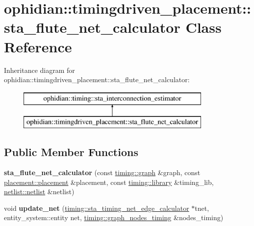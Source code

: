 \hypertarget{classophidian_1_1timingdriven__placement_1_1sta__flute__net__calculator}{\section{ophidian\-:\-:timingdriven\-\_\-placement\-:\-:sta\-\_\-flute\-\_\-net\-\_\-calculator Class Reference}
\label{classophidian_1_1timingdriven__placement_1_1sta__flute__net__calculator}
}
Inheritance diagram for ophidian\-:\-:timingdriven\-\_\-placement\-:\-:sta\-\_\-flute\-\_\-net\-\_\-calculator\-:\begin{figure}[H]
\begin{center}
\leavevmode
\includegraphics[height=2.000000cm]{classophidian_1_1timingdriven__placement_1_1sta__flute__net__calculator}
\end{center}
\end{figure}
\subsection*{Public Member Functions}
\begin{DoxyCompactItemize}
\item 
\hypertarget{classophidian_1_1timingdriven__placement_1_1sta__flute__net__calculator_a1808197d9d2e65f6bf2ad0f82123e766}{{\bfseries sta\-\_\-flute\-\_\-net\-\_\-calculator} (const \hyperlink{classophidian_1_1timing_1_1graph}{timing\-::graph} \&graph, const \hyperlink{classophidian_1_1placement_1_1placement}{placement\-::placement} \&placement, const \hyperlink{classophidian_1_1timing_1_1library}{timing\-::library} \&timing\-\_\-lib, \hyperlink{classophidian_1_1netlist_1_1netlist}{netlist\-::netlist} \&netlist)}\label{classophidian_1_1timingdriven__placement_1_1sta__flute__net__calculator_a1808197d9d2e65f6bf2ad0f82123e766}

\item 
\hypertarget{classophidian_1_1timingdriven__placement_1_1sta__flute__net__calculator_a5af3f771b140a743d01aabc7d0ef057f}{void {\bfseries update\-\_\-net} (\hyperlink{classophidian_1_1timing_1_1sta__timing__net__edge__calculator}{timing\-::sta\-\_\-timing\-\_\-net\-\_\-edge\-\_\-calculator} $\ast$tnet, entity\-\_\-system\-::entity net, \hyperlink{classophidian_1_1timing_1_1graph__nodes__timing}{timing\-::graph\-\_\-nodes\-\_\-timing} \&nodes\-\_\-timing)}\label{classophidian_1_1timingdriven__placement_1_1sta__flute__net__calculator_a5af3f771b140a743d01aabc7d0ef057f}

\end{DoxyCompactItemize}


